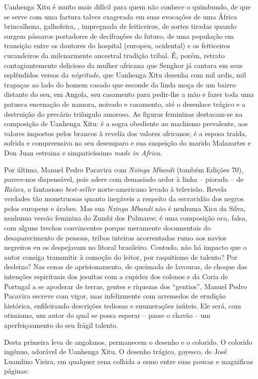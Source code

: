 \documentclass[
  letterpaper,
  DIV=11,
  numbers=noendperiod]{scrreprt}
\begin{document}
Uanhenga Xitu é muito mais difícil para quem não conhece o quimbundo, de
que se serve com uma fartura talvez exagerada em suas evocações de uma
África brincalhona, galhofeira, , impregnada de feiticeiros, de sortes
tiradas quando surgem pássaros portadores de decifrações do futuro, de
uma população em transição entre os doutores do hospital (europeu,
ocidental) e os feiticeiros curandeiros da milenarmente ancestral
tradição tribal. É, porém, retrato contagiantemente delicioso da mulher
africana que Senghor já cantara em seus esplêndidos versos da
\emph{négritude}, que Uanhenga Xitu desenha com mil ardis, mil trapaças
ao lado do homem casado que esconde da linda moça de um bairro distante
do seu, em Angola, seu casamento para pedir-lhe a mão e fazer toda uma
patusca encenação de namora, noivado e casamento, até o desenlace
trágico e a destruição do precário triângulo amoroso. As figuras
femininas destacam-se na composição de Uanhenga Xitu: é a sogra
obediente ao machismo prevalente, aos valores impostos pelos brancos à
revelia dos valores africanos; é a esposa traída, sofrida e compreensiva
no seu desemparo e sua suspeição do marido Malazartes e Don Juan
estroina e simpaticíssimo \emph{made in Africa}.

Por último, Manuel Pedro Pacavira com \emph{Nzinga Mbandi} (também
Edições 70), parece-nos dispensável, pois adere com demasiado ardor à
linha -- piorada -- de \emph{Raízes}, o fantasioso \emph{best-seller}
norte-americano levado à televisão. Revela verdades tão monstruosas
quanto inegáveis a respeito da escravidão dos negros pelos europeus e
árabes. Mas sua \emph{Nzinga Mbandi} não é nenhuma Xica da Silva,
nenhuma versão feminina do Zumbi dos Palmares; é uma composição oca,
falsa, com alguns trechos convincentes porque meramente documentais do
desaparecimento de pessoas, tribos inteiras acorrentadas rumo aos navios
negreiros eu os despejavam no litoral brasileiro. Contudo, não há
impacto que o autor consiga transmitir à comoção do leitor, por
raquitismo de talento? Por desleixo? Nas cenas de aprisionamento, de
queimada de lavouras, de choque das intenções espirituais dos jesuítas
com a cupidez dos colonos e da Coria de Portugal a se apoderar de
terras, gentes e riquezas dos ``gentios'', Manuel Pedro Pacavira escreve
com vigor, mas infelizmente com arremedos de erudição histórica,
enfileirando descrições tediosas e enumerações inúteis. Ele será, com
otimismo, um autor do qual se possa esperar -- passe o chavão -- um
aperfeiçoamento do seu frágil talento.

Desta primeira leva de angolanos, permanecem o desenho e o colorido. O
colorido ingênuo, adorável de Uanhenga Xitu. O desenho trágico, goyesco,
de José Luandino Vieira, em qualquer cena colhida a esmo entre suas
poucas e magnificas páginas:
\end{document}
